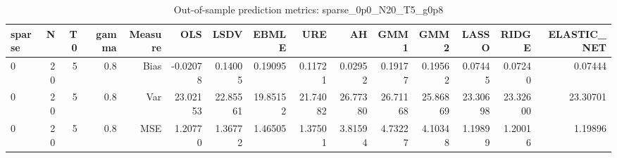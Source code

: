 \begin{table}[!htbp]\centering
\caption{Out-of-sample prediction metrics: sparse_0p0_N20_T5_g0p8}
\label{tab:table3_sparse_0p0_N20_T5_g0p8}
\begin{tabular}{lrrrrrrrrrrrrrr}
\hline
sparse & N & T0 & gamma & Measure & OLS & LSDV & EBMLE & URE & AH & GMM1 & GMM2 & LASSO & RIDGE & ELASTIC_NET \\
\hline
0 & 20 & 5 & 0.8 & Bias & -0.02078 & 0.14005 & 0.19095 & 0.11721 & 0.02952 & 0.19177 & 0.19562 & 0.07445 & 0.07240 & 0.07444 \\
0 & 20 & 5 & 0.8 & Var & 23.02153 & 22.85561 & 19.85152 & 21.74082 & 26.77380 & 26.71168 & 25.86869 & 23.30698 & 23.32600 & 23.30701 \\
0 & 20 & 5 & 0.8 & MSE & 1.20770 & 1.36772 & 1.46505 & 1.37501 & 3.81594 & 4.73227 & 4.10348 & 1.19899 & 1.20016 & 1.19896 \\
\hline
\end{tabular}
\end{table}

